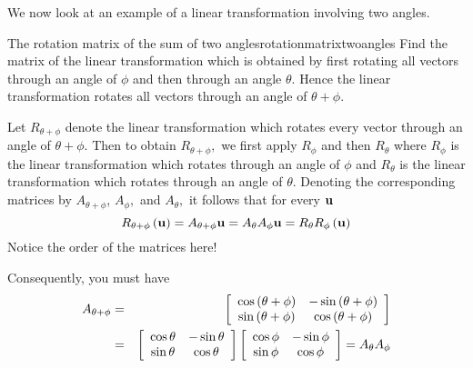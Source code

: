 We now look at an example of a linear transformation involving two angles.

\begin{example}{The rotation matrix of the sum of two angles}{rotationmatrixtwoangles}
Find the matrix of the linear transformation which is
obtained by first rotating all vectors through an angle of $\phi $ and then
through an angle $\theta .$ Hence the linear transformation 
rotates all vectors through an angle of $\theta +\phi .$
\end{example}

\begin{solution}
Let $R_{\theta +\phi }$ denote the linear transformation which rotates every
vector through an angle of $\theta +\phi .$ 
Then to obtain $R_{\theta +\phi },$
we first apply $R_{\phi }$ and then $R_{\theta }$ where $R_{\phi }$
is the linear transformation which rotates through an angle of $\phi $ and 
$R_{\theta }$ is the linear transformation which rotates through an angle of 
$\theta $. Denoting the corresponding matrices by $A_{\theta +\phi }$, 
$A_{\phi },$ and $A_{\theta },$ it follows that for every ${\bf u}$
\begin{equation*}
R_{\theta +\phi }\left({\bf u}\right)=A_{\theta +\phi }{\bf u}=A_{\theta }A_{\phi }{\bf u} = R_{\theta }R_{\phi }
\left({\bf u}\right)
\end{equation*}
Notice the order of the matrices here! 

Consequently, you must have
\begin{eqnarray*}
A_{\theta +\phi } &=&\left[
\begin{array}{cc}
\cos \left( \theta +\phi \right) & -\sin \left( \theta +\phi \right) \\
\sin \left( \theta +\phi \right) & \cos \left( \theta +\phi \right)
\end{array}
\right]\\
&=&\left[
\begin{array}{cc}
\cos \theta & -\sin \theta \\
\sin \theta & \cos \theta
\end{array}
\right] \left[
\begin{array}{cc}
\cos \phi & -\sin \phi \\
\sin \phi & \cos \phi
\end{array}
\right] 
 =A_{\theta }A_{\phi } 
\end{eqnarray*}


\end{solution}
